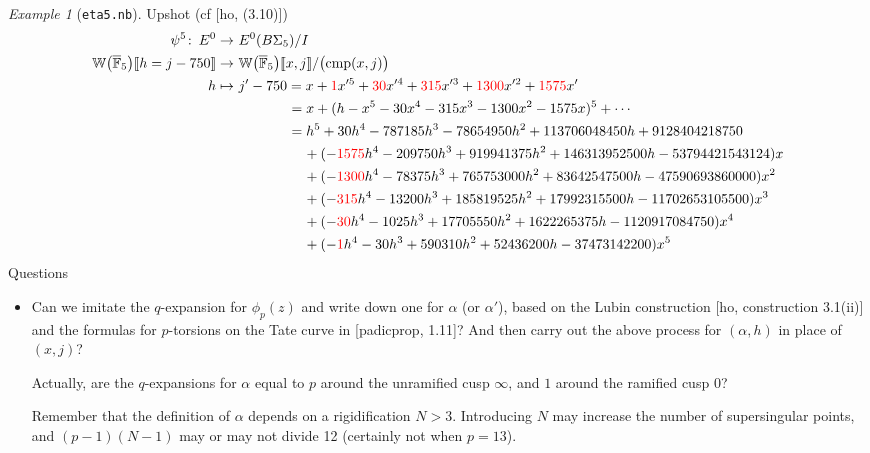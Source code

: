 \documentclass{rs}
\theoremstyle{definition}
\theoremstyle{remark}
\newtheorem{ex}[thm]{Example}
\def\co{\colon\thinspace}
\newcommand{\mb}[1]{\mathbb{#1}}
\newcommand{\cF}{\overline {\mb F}}
\newcommand{\cmp}{{\rm cmp}}
\newcommand{\BW}{{\mb W}}
\newcommand{\A}{\alpha}
\newcommand{\lb}{\llbracket}
\newcommand{\rb}{\rrbracket}
\renewcommand{\=}{\approx}
\renewcommand{\-}{\sim}
\newcommand{\rd}[1]{\textcolor{red}{#1}}
\numberwithin{equation}{section}
\numberwithin{thm}{section}
\begin{document}
\begin{ex}[\texttt{eta5.nb}]
 Upshot (cf [ho, (3.10)]) 
 \begin{equation*}
  \begin{split}
                          \psi^5 \co E^0 \to & ~ E^0(B\Sigma_5) / I \\
   \BW\big(\cF_5\big)\lb h = j - 750 \rb \to & ~ \BW\big(\cF_5\big)\lb x,j \rb / \big(\cmp(x,j)\big) \\
                                   h \mapsto & ~    j' - 750 = x + \rd{1} x'^5 + \rd{30} x'^4 + \rd{315} x'^3 + \rd{1300} x'^2 + \rd{1575} x' \\
                                             & \hskip 1.35cm = x + (h - x^5 - 30 x^4 - 315 x^3 - 1300 x^2 - 1575 x)^5 + \cdots \\
                                             & \hskip 1.35cm = h^5 + 30 h^4 - 787185 h^3 - 78654950 h^2 + 113706048450 h + 9128404218750 \\
                                             & \hskip 1.75cm   + (-\rd{1575} h^4 - 209750 h^3 + 919941375 h^2 + 146313952500 h - 53794421543124) x \\
                                             & \hskip 1.75cm   + (-\rd{1300} h^4 - 78375 h^3 + 765753000 h^2 + 83642547500 h - 47590693860000) x^2 \\
                                             & \hskip 1.75cm   + (-\rd{315} h^4 - 13200 h^3 + 185819525 h^2 + 17992315500 h - 11702653105500) x^3 \\
                                             & \hskip 1.75cm   + (-\rd{30} h^4 - 1025 h^3 + 17705550 h^2 + 1622265375 h - 1120917084750) x^4 \\
                                             & \hskip 1.75cm   + (-\rd{1} h^4 - 30 h^3 + 590310 h^2 + 52436200 h - 37473142200) x^5 
  \end{split}
 \end{equation*}
 Questions 
 \begin{itemize}
  \item Can we imitate the $q$-expansion for $\phi_p(z)$ and write down one for $\A$ (or $\A'$), 
  based on the Lubin construction [ho, construction 3.1(ii)] and the formulas for $p$-torsions on the Tate curve in [padicprop, 1.11]?  
  And then carry out the above process for $(\A,h)$ in place of $(x,j)$?  

  Actually, are the $q$-expansions for $\A$ equal to $p$ around 
  the unramified cusp $\infty$, and $1$ around the ramified cusp $0$?  

  Remember that the definition of $\A$ depends on a rigidification $N > 3$.  
  Introducing $N$ may increase the number of supersingular points, 
  and $(p - 1) (N - 1)$ may or may not divide 12 (certainly not when $p = 13$).  


\end{itemize}
\end{ex}
\end{document}
